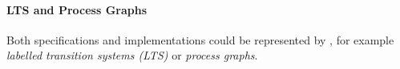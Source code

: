 \documentclass[99-notes-packed.tex]{subfiles}
\begin{document}




\paragraph*{LTS and Process Graphs}
Both specifications and implementations could be represented by , for example \textit{labelled transition systems (LTS)} or \textit{process graphs}.
\end{document}
